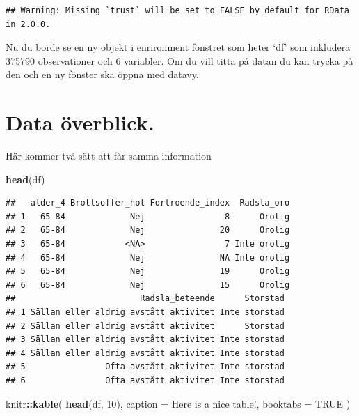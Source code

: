 \documentclass[
]{book}
\newenvironment{Shaded}{\begin{snugshade}}{\end{snugshade}}
\newcommand{\AttributeTok}[1]{\textcolor[rgb]{0.13,0.29,0.53}{#1}}
\newcommand{\ConstantTok}[1]{\textcolor[rgb]{0.56,0.35,0.01}{#1}}
\newcommand{\DecValTok}[1]{\textcolor[rgb]{0.00,0.00,0.81}{#1}}
\newcommand{\FunctionTok}[1]{\textcolor[rgb]{0.13,0.29,0.53}{\textbf{#1}}}
\newcommand{\NormalTok}[1]{#1}
\newcommand{\SpecialCharTok}[1]{\textcolor[rgb]{0.81,0.36,0.00}{\textbf{#1}}}
\newcommand{\StringTok}[1]{\textcolor[rgb]{0.31,0.60,0.02}{#1}}
\begin{document}
\begin{verbatim}
## Warning: Missing `trust` will be set to FALSE by default for RData in 2.0.0.
\end{verbatim}

Nu du borde se en ny objekt i enrironment fönstret som heter `df' som
inkludera 375790 observationer och 6 variabler. Om du vill titta på
datan du kan trycka på den och en ny fönster ska öppna med datavy.

\section{Data överblick.}\label{data-uxf6verblick.}

Här kommer två sätt att får samma information

\begin{Shaded}
\begin{Highlighting}[]
\FunctionTok{head}\NormalTok{(df)}
\end{Highlighting}
\end{Shaded}

\begin{verbatim}
##   alder_4 Brottsoffer_hot Fortroende_index  Radsla_oro
## 1   65-84             Nej                8      Orolig
## 2   65-84             Nej               20      Orolig
## 3   65-84            <NA>                7 Inte orolig
## 4   65-84             Nej               NA Inte orolig
## 5   65-84             Nej               19      Orolig
## 6   65-84             Nej               15      Orolig
##                         Radsla_beteende      Storstad
## 1 Sällan eller aldrig avstått aktivitet Inte storstad
## 2 Sällan eller aldrig avstått aktivitet      Storstad
## 3 Sällan eller aldrig avstått aktivitet Inte storstad
## 4 Sällan eller aldrig avstått aktivitet Inte storstad
## 5                Ofta avstått aktivitet Inte storstad
## 6                Ofta avstått aktivitet Inte storstad
\end{verbatim}

\begin{Shaded}
\begin{Highlighting}[]
\NormalTok{knitr}\SpecialCharTok{::}\FunctionTok{kable}\NormalTok{(}
  \FunctionTok{head}\NormalTok{(df, }\DecValTok{10}\NormalTok{), }\AttributeTok{caption =} \StringTok{\textquotesingle{}Here is a nice table!\textquotesingle{}}\NormalTok{,}
  \AttributeTok{booktabs =} \ConstantTok{TRUE}
\NormalTok{)}
\end{Highlighting}
\end{Shaded}
\end{document}
